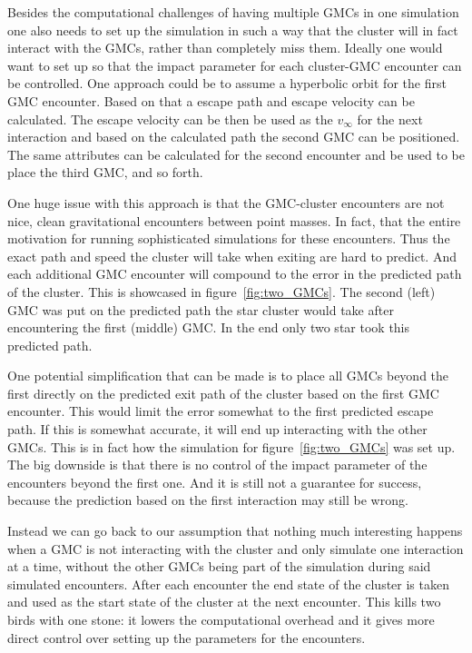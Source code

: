 \documentclass{aa}
\begin{document}
Besides the computational challenges of having multiple GMCs in one simulation one also needs to set up the simulation in such a way that the cluster will in fact interact with the GMCs, rather than completely miss them. Ideally one would want to set up so that the impact parameter for each cluster-GMC encounter can be controlled. One approach could be to assume a hyperbolic orbit for the first GMC encounter. Based on that a escape path and escape velocity can be calculated. The escape velocity can be then be used as the $v_\infty$ for the next interaction and based on the calculated path the second GMC can be positioned. The same attributes can be calculated for the second encounter and be used to be place the third GMC, and so forth.

One huge issue with this approach is that the GMC-cluster encounters are not nice, clean gravitational encounters between point masses. In fact, that the entire motivation for running sophisticated simulations for these encounters. Thus the exact path and speed the cluster will take when exiting are hard to predict.  And each additional GMC encounter will compound to the error in the predicted path of the cluster. This is showcased in figure~\ref{fig:two_GMCs}. The second (left) GMC was put on the predicted path the star cluster would take after encountering the first (middle) GMC. In the end only two star took this predicted path. 

One potential simplification that can be made is to place all GMCs beyond the first directly on the predicted exit path of the cluster based on the first GMC encounter. This would limit the error somewhat to the first predicted escape path. If this is somewhat accurate, it will end up interacting with the other GMCs. This is in fact how the simulation for figure~\ref{fig:two_GMCs} was set up. The big downside is that there is no control of the impact parameter of the encounters beyond the first one. And it is still not a guarantee for success, because the prediction based on the first interaction may still be wrong.

Instead we can go back to our assumption that nothing much interesting happens when a GMC is not interacting with the cluster and only simulate one interaction at a time, without the other GMCs being part of the simulation during said simulated encounters. After each encounter the end state of the cluster is taken and used as the start state of the cluster at the next encounter. This kills two birds with one stone: it lowers the computational overhead and it gives more direct control over setting up the parameters for the encounters.
\end{document}
